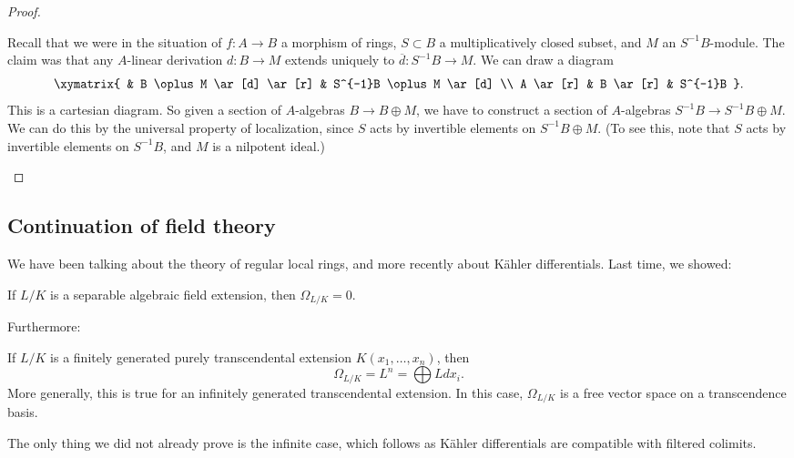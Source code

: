\begin{proof}
\begin{enumerate}
Recall that we were in the situation of $f: A \to B$  a morphism of rings, $S
\subset B$ a multiplicatively closed subset, and $M$ an $S^{-1}B$-module. The
claim was that any $A$-linear derivation $d: B \to M$ extends uniquely to
$\overline{d}: S^{-1} B \to M$.
We can draw a diagram
\[ \xymatrix{
& B \oplus M \ar[d] \ar[r] &  S^{-1}B \oplus M \ar[d] \\
A \ar[r] &  B \ar[r] &  S^{-1}B
}.\]
This is a cartesian diagram. So given a section of $A$-algebras $B \to B \oplus M$, we have to
construct a section of $A$-algebras $S^{-1}B \to S^{-1}B \oplus M$. We can do this by the
universal property of localization, since $S$ acts by invertible elements on
$S^{-1}B \oplus M$. (To see this, note that $S$ acts by invertible elements on
$S^{-1}B$, and $M$ is a nilpotent ideal.)
\end{enumerate}
\end{proof} 

\subsection{Continuation of field theory}

We have been talking about the theory of regular local rings, and more recently
about K\"ahler differentials. Last time, we showed:

\begin{proposition} 
If $L/K$ is a separable algebraic field extension, then $\Omega_{L/K} = 0$.
\end{proposition} 

Furthermore:

\begin{proposition} 
If $L/K$ is a finitely generated purely transcendental extension $K(x_1, \dots, x_n)$, then 
\[ \Omega_{L/K} = L^n = \bigoplus L dx_i.  \]
More generally, this is true for an infinitely generated transcendental
extension. In this case, $\Omega_{L/K}$ is a free vector space on a
transcendence basis.
\end{proposition} 
The only thing we did not already prove is the infinite case, which follows as
K\"ahler differentials are compatible with filtered colimits.

